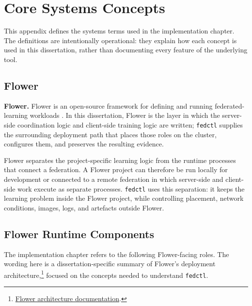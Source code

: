 \chapter{Core Systems Concepts}
\label{appendix:systems_definitions}

This appendix defines the systems terms used in the implementation chapter. The definitions are intentionally operational: they explain how each concept is used in this dissertation, rather than documenting every feature of the underlying tool.

\section{Flower}
\label{def:flower}

\begin{definition}
\textbf{Flower.}
Flower is an open-source framework for defining and running federated-learning workloads \parencite{beutel2022flower}. In this dissertation, Flower is the layer in which the server-side coordination logic and client-side training logic are written; \texttt{fedctl} supplies the surrounding deployment path that places those roles on the cluster, configures them, and preserves the resulting evidence.
\end{definition}

Flower separates the project-specific learning logic from the runtime processes that connect a federation. A Flower project can therefore be run locally for development or connected to a remote federation in which server-side and client-side work execute as separate processes. \texttt{fedctl} uses this separation: it keeps the learning problem inside the Flower project, while controlling placement, network conditions, images, logs, and artefacts outside Flower.

\section{Flower Runtime Components}
\label{def:flower_components}

The implementation chapter refers to the following Flower-facing roles. The wording here is a dissertation-specific summary of Flower's deployment architecture,\footnote{\href{https://flower.ai/docs/framework/explanation-flower-architecture.html}{Flower architecture documentation}.} focused on the concepts needed to understand \texttt{fedctl}.

